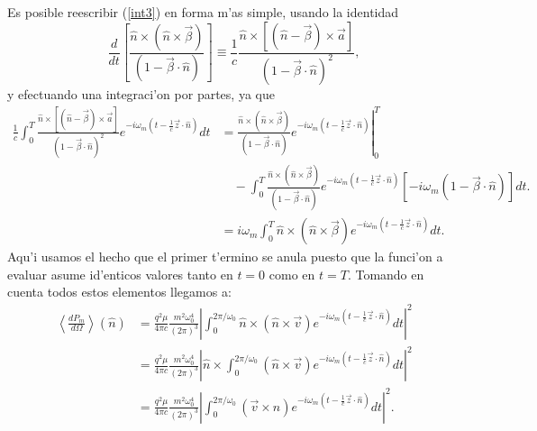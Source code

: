 Es posible reescribir (\ref{int3}) en forma m'as simple, usando la identidad
\begin{equation}
\frac{d}{dt}\left[ \frac{\hat{n}\times\left(  \hat{n}\times\vec{\beta}\right)
}{\left(  1-\vec{\beta}\cdot\hat{n}\right)  }\right] \equiv\frac{1}{c}
\frac{\hat{n}\times\left[
\left(  \hat{n}-\vec{\beta}\right)  \times\vec{a}\right]
}{\left(  1-\vec{\beta}\cdot\hat{n}\right)^2}, \label{iddt1}
\end{equation}
y efectuando una integraci'on por partes, ya que
\begin{align}
\frac{1}{c}\int_0^{T}\frac{\hat{n}\times\left[\left(\hat{n}-\vec{\beta}\right)
\times\vec{a}\right]}{\left(1-\vec{\beta}\cdot\hat{n}\right)^2} e^{-i\omega_{m}\left(t-\frac{1}{c}\vec{z}\cdot\hat{n}\right)}dt
&= \left.\frac{\hat{n}\times\left(\hat{n}\times\vec{\beta}\right)
}{\left(1-\vec{\beta}\cdot\hat{n}\right)} e^{-i\omega_{m}\left(t-\frac{1}{c}\vec{z}\cdot\hat{n}\right)  }\right|^T_0
\nonumber\\
&\quad- \int_0^{T}\frac{\hat{n}\times\left(
\hat{n}\times\vec{\beta}\right)}{\left(  1-\vec{\beta}\cdot\hat{n}\right) }
e^{-i\omega_{m}\left(t-\frac{1}{c}\vec{z}\cdot\hat{n}\right)} \left[-i\omega_m(1-\vec{\beta}\cdot\hat{n})\right] dt. \\
&=i\omega_m \int_0^{T}\hat{n}\times\left(\hat{n}\times\vec{\beta}\right)
e^{-i\omega_{m}\left(t-\frac{1}{c}\vec{z}\cdot\hat{n}\right)  }dt.
\end{align}
Aqu'i usamos el hecho que el primer t'ermino se anula puesto que la funci'on a evaluar asume
id'enticos valores tanto en $t=0$ como en $t=T$. Tomando en cuenta todos estos
elementos llegamos a:
\begin{align}
\left\langle \frac{dP_{m}}{d\Omega}\right\rangle (\hat{n}) &
=\frac{q^2\mu}{4\pi c}\frac{m^2\omega_0^4}{\left(2\pi\right)^3}\left|\int_0^{2\pi/\omega_0}\hat{n}\times\left(\hat{n}\times\vec{v}\right)
e^{-i\omega_{m}\left(t-\frac{1}{c}\vec{z}\cdot\hat{n}\right)}dt \right|^2\\
&=\frac{q^2\mu}{4\pi c}\frac{m^2\omega_0^4}{\left(2\pi\right)^3}\left|
\hat{n}\times\int_0^{2\pi/\omega_0}\left(  \hat{n}\times\vec{v}\right)
e^{-i\omega_{m}\left(t-\frac{1}{c}\vec{z}\cdot\hat{n}\right)  }dt \right|^2\\
&=\frac{q^2\mu}{4\pi c}\frac{m^2\omega_0^4}{\left(2\pi\right)^3}\left|
\int_0^{2\pi/\omega_0}\left(  \vec{v}\times\hat{n}\right)  e^{-i\omega
_{m}\left(t-\frac{1}{c}\vec{z}\cdot\hat{n}\right) }dt \right|^2.
\end{align}


